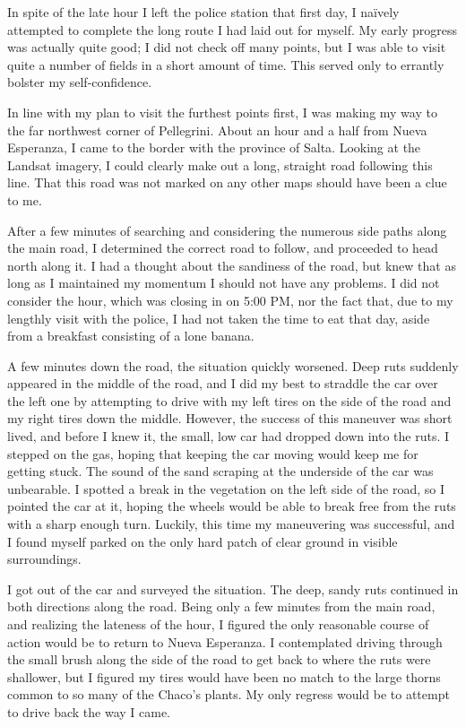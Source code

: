 In spite of the late hour I left the police station that first day, I naïvely attempted to complete the long route I had laid out for myself. My early progress was actually quite good; I did not check off many points, but I was able to visit quite a number of fields in a short amount of time. This served only to errantly bolster my self-confidence.

In line with my plan to visit the furthest points first, I was making my way to the far northwest corner of Pellegrini. About an hour and a half from Nueva Esperanza, I came to the border with the province of Salta. Looking at the Landsat imagery, I could clearly make out a long, straight road following this line. That this road was not marked on any other maps should have been a clue to me.

After a few minutes of searching and considering the numerous side paths along the main road, I determined the correct road to follow, and proceeded to head north along it. I had a thought about the sandiness of the road, but knew that as long as I maintained my momentum I should not have any problems. I did not consider the hour, which was closing in on 5:00 PM, nor the fact that, due to my lengthly visit with the police, I had not taken the time to eat that day, aside from a breakfast consisting of a lone banana.

A few minutes down the road, the situation quickly worsened. Deep ruts suddenly appeared in the middle of the road, and I did my best to straddle the car over the left one by attempting to drive with my left tires on the side of the road and my right tires down the middle. However, the success of this maneuver was short lived, and before I knew it, the small, low car had dropped down into the ruts. I stepped on the gas, hoping that keeping the car moving would keep me for getting stuck. The sound of the sand scraping at the underside of the car was unbearable. I spotted a break in the vegetation on the left side of the road, so I pointed the car at it, hoping the wheels would be able to break free from the ruts with a sharp enough turn. Luckily, this time my maneuvering was successful, and I found myself parked on the only hard patch of clear ground in visible surroundings.

I got out of the car and surveyed the situation. The deep, sandy ruts continued in both directions along the road. Being only a few minutes from the main road, and realizing the lateness of the hour, I figured the only reasonable course of action would be to return to Nueva Esperanza. I contemplated driving through the small brush along the side of the road to get back to where the ruts were shallower, but I figured my tires would have been no match to the large thorns common to so many of the Chaco’s plants. My only regress would be to attempt to drive back the way I came.

